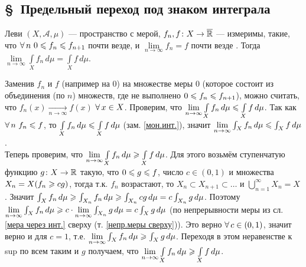 \subsection*{\S\ Предельный переход под знаком интеграла}

\begin{teor}[https://www.youtube.com/live/fVyBKDoy3EM?si=zJ2pF8EZ8K5EST4n&t=10491]{Леви}\label{т.Леви}
	 $(X, \mathcal A, \mu)$ --- пространство с мерой, $f_n, f \colon X \to \overline{\mathbb R}$ --- измеримы, такие, что $\forall \, n\ 0 \leqslant f_n \leqslant f_{n + 1}$ почти везде, и $\lim\limits_{n \to \infty} f_n = f$ почти везде . Тогда $\lim\limits_{n \to \infty} \int\limits_X f_n \, d\mu = \int\limits_X f \, d\mu$.
\end{teor}

\begin{prf}
	Заменив $f_n$ и $f$ (например на 0) на множестве меры 0 (которое состоит из объединения (по $n$) множеств, где не выполнено $0 \leqslant f_n \leqslant f_{n+1}$), можно считать, что $f_n(x) \xrightarrow[n \to \infty]{} f(x)$ $\forall \, x \in X$.
	Проверим, что $\lim\limits_{n \to \infty} \int\limits_X f_n \, d\mu \leqslant \int\limits_X f \, d\mu$. Так как $\forall \, n\ f_n \leqslant f$, то $\int\limits_X f_n \, d\mu \leqslant\int\limits_X f \, d\mu$ (зам. \ref{мон.инт.}), значит $\lim\limits_{n \to \infty} \int_X f_n \, d\mu \leqslant \int_X f \, d\mu$.\\
	Теперь проверим, что  $\lim\limits_{n \to \infty} \int\limits_X f_n \, d\mu \geqslant \int\limits_X f \, d\mu$. Для этого возьмём ступенчатую функцию $g \colon X \to \mathbb R$ такую, что $0 \leqslant g \leqslant f$, число $c \in (0, 1)$ и множества $X_n = X (f_n \geqslant cg)$, тогда т.к. $f_n$ возрастают, то $X_n \subset X_{n + 1} \subset \ldots$ и $\bigcup\limits_{n = 1}^\infty X_n = X$ . Значит $\int_X f_n \, d\mu \geqslant \int_{X_n} f_n \, d\mu \geqslant \int_{X_n} cg \, d\mu = c \int_{X_n} g \, d\mu$. Поэтому $\lim\limits_{n \to \infty}\int_X f_n \, d\mu \geqslant c \cdot\lim\limits_{n \to \infty} \int_{X_n} g \, d\mu = c\int_{X} g \, d\mu$ (по непрерывности меры из сл. \ref{мера через инт.} сверху (т. \ref{непр.меры сверху})). Это верно $\forall \, c \in (0, 1)$, значит верно и для $c = 1$, т.е. $\lim\limits_{n \to \infty}\int_X f_n \, d\mu \geqslant \int_{X} g \, d\mu$. Переходя в этом неравенстве к sup по всем таким и $g$ получаем, что $\lim\limits_{n \to \infty} \int\limits_X f_n \, d\mu \geqslant \int\limits_X f \, d\mu$.
\end{prf}

